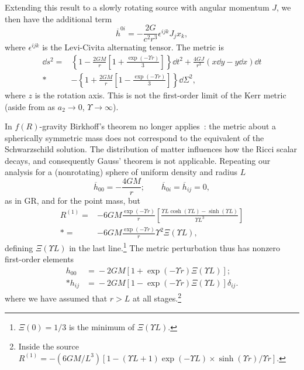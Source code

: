 Extending this result to a slowly rotating source with angular momentum $J$, we then have the additional term~\cite{Hobson2006}
\begin{equation}
\overline{h}^{0i} = -\frac{2G}{c^2r^3} \epsilon^{ijk}J_j x_k,
\end{equation}
where $\epsilon^{ijk}$ is the Levi-Civita alternating tensor. The metric is
\begin{align}
\dd s^2 = {} & \left\{1-\frac{2GM}{r}\left[1 + \frac{\exp(- \Upsilon r)}{3}\right]\right\}\dd t^2 + \frac{4GJ}{r^3}\left(x\dd y - y\dd x\right)\dd t \nonumber \\*
 & - {} \left\{1 +\frac{2GM}{r}\left[1 - \frac{\exp(- \Upsilon r)}{3}\right]\right\}\dd \Sigma^2,\label{eq:f(R)_Kerr}
\end{align}
where $z$ is the rotation axis. This is not the first-order limit of the Kerr metric (aside from as $a_2 \rightarrow 0$, $\Upsilon \rightarrow \infty$).

In $f(R)$-gravity Birkhoff's theorem no longer applies~\cite{Pechlaner1966, Stelle1978, Clifton2006, Capozziello2009b, Stabile2010}: the metric about a spherically symmetric mass does not correspond to the equivalent of the Schwarzschild solution. The distribution of matter influences how the Ricci scalar decays, and consequently Gauss' theorem is not applicable. Repeating our analysis for a (nonrotating) sphere of uniform density and radius $L$
\begin{equation}
\overline{h}_{00} = -\frac{4GM}{r}; \qquad \overline{h}_{0i} = \overline{h}_{ij} = 0,
\end{equation}
as in GR, and for the point mass, but
\begin{align}
R^{(1)} = {} & -6 G M \frac{\exp(- \Upsilon r)}{r}\left[\frac{\Upsilon L\cosh(\Upsilon L) - \sinh(\Upsilon L)}{\Upsilon L^3}\right] \nonumber \\*
 = {} &  -6 G M \frac{\exp(- \Upsilon r)}{r}\Upsilon^2\Xi(\Upsilon L),
\end{align}
defining $\Xi(\Upsilon L)$ in the last line.\footnote{$\Xi(0) = 1/3$ is the minimum of $\Xi(\Upsilon L)$.} The metric perturbation thus has nonzero first-order elements~\cite{Stelle1978, Capozziello2009b, Stabile2010}
\begin{equation}
\begin{split}
h_{00} & = {} -2 G M \left[1 + \exp(- \Upsilon r)\Xi(\Upsilon L)\right]; \\*
h_{ij} & = {} -2 G M \left[1 - \exp(- \Upsilon r)\Xi(\Upsilon L)\right]\delta_{ij}.
\label{eq:Uniform}
\end{split}
\end{equation}
where we have assumed that $r > L$ at all stages.\footnote{Inside the source $R^{(1)} = -{(6 G M/{L^3})}[1 - (\Upsilon L + 1)\exp(-\Upsilon L) \times\sinh(\Upsilon r)/\Upsilon r]$.}

